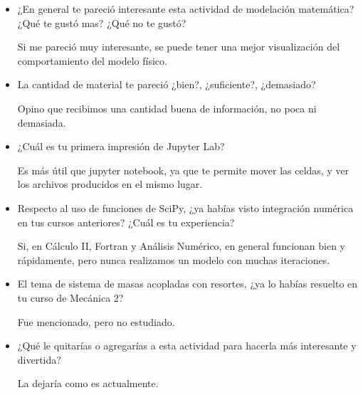 \documentclass[a4paper]{article}
\begin{document}
\begin{itemize}
\item     ¿En general te pareció interesante esta actividad de modelación matemática? ¿Qué te gustó mas? ¿Qué no te gustó?

Si me pareció muy interesante, se puede tener una mejor visualización del comportamiento del modelo físico.

\item     La cantidad de material te pareció ¿bien?, ¿suficiente?, ¿demasiado?

Opino que recibimos una cantidad buena de información, no poca ni demasiada.

\item     ¿Cuál es tu primera impresión de Jupyter Lab? 

Es más útil que jupyter notebook, ya que te permite mover las celdas, y ver los archivos producidos en el mismo lugar.

\item     Respecto al uso de funciones de SciPy, ¿ya habías visto integración numérica en tus cursos anteriores? ¿Cuál es tu experiencia?

Si, en Cálculo II, Fortran y Análisis Numérico, en general funcionan bien y rápidamente, pero nunca realizamos un modelo con muchas iteraciones.

\item     El tema de sistema de masas acopladas con resortes, ¿ya lo habías resuelto en tu curso de Mecánica 2?  

Fue mencionado, pero no estudiado.


\item     ¿Qué le quitarías o agregarías a esta actividad para hacerla más interesante y divertida? 

La dejaría como es actualmente.

\end{itemize}
\end{document}
